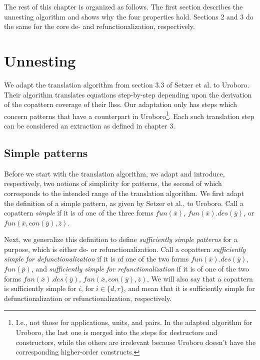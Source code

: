 The rest of this chapter is organized as follows. The first section describes the unnesting algorithm and shows why the four properties hold. Sections 2 and 3 do the same for the core de- and refunctionalization, respectively.

\section{Unnesting}
\label{sec:unn}

We adapt the translation algorithm from section 3.3 of Setzer et al.\cite{setzer14unnesting} to Uroboro. Their algorithm translates equations step-by-step depending upon the derivation of the copattern coverage of their lhss. Our adaptation only has steps which concern patterns that have a counterpart in Uroboro\footnote{I.e., not those for applications, units, and pairs. In the adapted algorithm for Uroboro, the last one is merged into the steps for destructors and constructors, while the others are irrelevant because Uroboro doesn't have the corresponding higher-order constructs.}. Each such translation step can be considered an extraction as defined in chapter 3.

\subsection{Simple patterns}

Before we start with the translation algorithm, we adapt and introduce, respectively, two notions of simplicity for patterns, the second of which corresponds to the intended range of the translation algorithm. We first adapt the definition of a simple pattern, as given by Setzer et al., to Uroboro. Call a copattern \textit{simple} if it is of one of the three forms $fun(\overline{x})$, $fun(\overline{x}).des(\overline{y})$, or $fun(\overline{x}, con(\overline{y}), \overline{z})$.

Next, we generalize this definition to define \textit{sufficiently simple patterns} for a purpose, which is either de- or refunctionalization. Call a copattern \textit{sufficiently simple for defunctionalization} if it is of one of the two forms $fun(\overline{x}).des(\overline{y})$, $fun(\overline{p})$, and \textit{sufficiently simple for refunctionalization} if it is of one of the two forms $fun(\overline{x}).\overline{des(\overline{y})}$, $fun(\overline{x}, con(\overline{y}), \overline{z})$. We will also say that a copattern is sufficiently simple for $i$, for $i \in \{d,r\}$, and mean that it is sufficiently simple for defunctionalization or refunctionalization, respectively.

